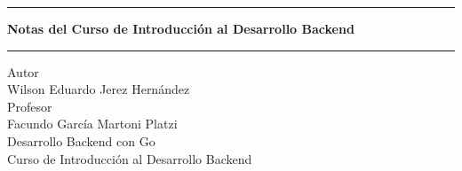 \pagestyle{empty}
\begin{center}
\begin{figure}[h]
\centering


\end{figure}
\Large
\hrule
\vspace{4mm}
\textbf{Notas del Curso de Introducción al Desarrollo Backend}\\

\vspace{4mm}
\hrule
\large
\vfill
Autor\\

Wilson Eduardo Jerez Hernández \\
\vfill
Profesor\\

Facundo García Martoni
\vfill
Platzi\\
Desarrollo Backend con Go\\
Curso de Introducción al Desarrollo Backend\\
\end{center}
\newpage


\tableofcontents
\newpage